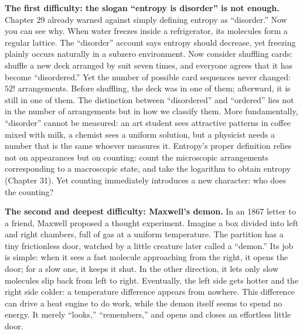 \textbf{The first difficulty: the slogan ``entropy is disorder'' is not enough.} Chapter 29 already warned against simply defining entropy as ``disorder.'' Now you can see why. When water freezes inside a refrigerator, its molecules form a regular lattice. The ``disorder'' account says entropy should decrease, yet freezing plainly occurs naturally in a subzero environment. Now consider shuffling cards: shuffle a new deck arranged by suit seven times, and everyone agrees that it has become ``disordered.'' Yet the number of possible card sequences never changed: $52!$ arrangements. Before shuffling, the deck was in one of them; afterward, it is still in one of them. The distinction between ``disordered'' and ``ordered'' lies not in the number of arrangements but in how we classify them. More fundamentally, ``disorder'' cannot be measured: an art student sees attractive patterns in coffee mixed with milk, a chemist sees a uniform solution, but a physicist needs a number that is the same whoever measures it. Entropy's proper definition relies not on appearances but on counting: count the microscopic arrangements corresponding to a macroscopic state, and take the logarithm to obtain entropy (Chapter 31). Yet counting immediately introduces a new character: who does the counting?

\textbf{The second and deepest difficulty: Maxwell's demon.} In an 1867 letter to a friend, Maxwell proposed a thought experiment. Imagine a box divided into left and right chambers, full of gas at a uniform temperature. The partition has a tiny frictionless door, watched by a little creature later called a ``demon.'' Its job is simple: when it sees a fast molecule approaching from the right, it opens the door; for a slow one, it keeps it shut. In the other direction, it lets only slow molecules slip back from left to right. Eventually, the left side gets hotter and the right side colder: a temperature difference appears from nowhere. This difference can drive a heat engine to do work, while the demon itself seems to spend no energy. It merely ``looks,'' ``remembers,'' and opens and closes an effortless little door.

